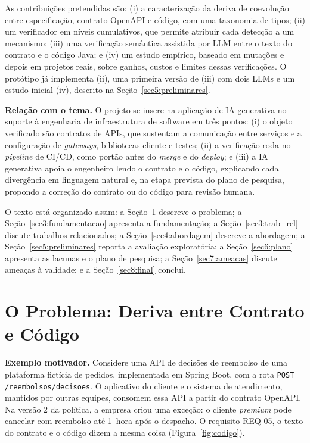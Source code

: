 \documentclass[12pt]{article}
\newcommand{\code}[1]{\texttt{#1}}
\begin{document}
As contribuições pretendidas são: (i) a caracterização da deriva de coevolução entre especificação, contrato OpenAPI e código, com uma taxonomia de tipos; (ii) um verificador em níveis cumulativos, que permite atribuir cada detecção a um mecanismo; (iii) uma verificação semântica assistida por LLM entre o texto do contrato e o código Java; e (iv) um estudo empírico, baseado em mutações e depois em projetos reais, sobre ganhos, custos e limites dessas verificações. O protótipo já implementa (ii), uma primeira versão de (iii) com dois LLMs e um estudo inicial (iv), descrito na Seção~\ref{sec5:preliminares}.

\textbf{Relação com o tema.} O projeto se insere na aplicação de IA generativa no suporte à engenharia de infraestrutura de software em três pontos: (i) o objeto verificado são contratos de APIs, que sustentam a comunicação entre serviços e a configuração de \textit{gateways}, bibliotecas cliente e testes; (ii) a verificação roda no \textit{pipeline} de CI/CD, como portão antes do \textit{merge} e do \textit{deploy}; e (iii) a IA generativa apoia o engenheiro lendo o contrato e o código, explicando cada divergência em linguagem natural e, na etapa prevista do plano de pesquisa, propondo a correção do contrato ou do código para revisão humana.

O texto está organizado assim: a Seção~\ref{sec2:problema} descreve o problema; a Seção~\ref{sec3:fundamentacao} apresenta a fundamentação; a Seção~\ref{sec3:trab_rel} discute trabalhos relacionados; a Seção~\ref{sec4:abordagem} descreve a abordagem; a Seção~\ref{sec5:preliminares} reporta a avaliação exploratória; a Seção~\ref{sec6:plano} apresenta as lacunas e o plano de pesquisa; a Seção~\ref{sec7:ameacas} discute ameaças à validade; e a Seção~\ref{sec8:final} conclui.

\section{O Problema: Deriva entre Contrato e Código}
\label{sec2:problema}

\textbf{Exemplo motivador.} Considere uma API de decisões de reembolso de uma plataforma fictícia de pedidos, implementada em Spring Boot, com a rota \code{POST /reembolsos/decisoes}. O aplicativo do cliente e o sistema de atendimento, mantidos por outras equipes, consomem essa API a partir do contrato OpenAPI. Na versão 2 da política, a empresa criou uma exceção: o cliente \textit{premium} pode cancelar com reembolso até 1~hora após o despacho. O requisito REQ-05, o texto do contrato e o código dizem a mesma coisa (Figura~\ref{fig:codigo}).
\end{document}
